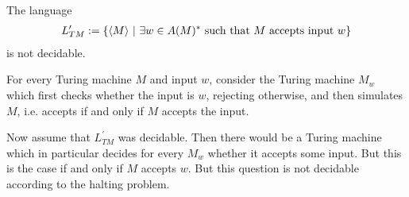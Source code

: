 \begin{Corollary}
	The language
	\begin{align*}
		L_{TM}^\prime := \{ \langle M \rangle ~|~ \exists w \in A(M)^* ~\text{such that $M$ accepts input $w$} \}
	\end{align*}
	is not decidable.
\end{Corollary}
\proof
	For every Turing machine $M$ and input $w$, consider the Turing machine $M_w$ which first checks whether the input is $w$, rejecting otherwise, and then simulates $M$, i.e. accepts if and only if $M$ accepts the input.

	Now assume that $L_{TM}^\prime$ was decidable. Then there would be a Turing machine which in particular decides for every $M_w$ whether it accepts some input. But this is the case if and only if $M$ accepts $w$. But this question is not decidable according to the halting problem.
\endproof